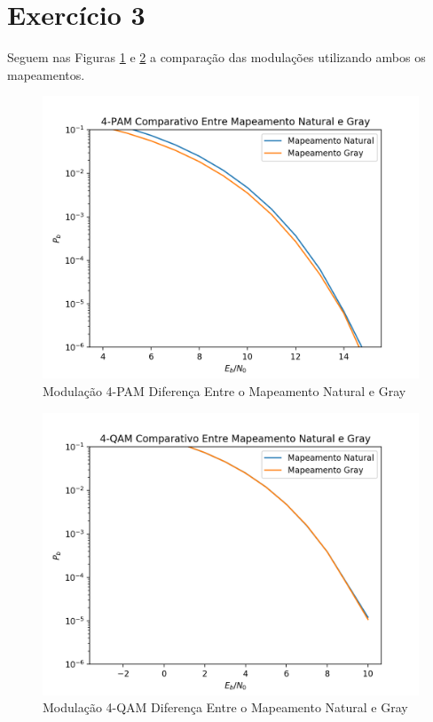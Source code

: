 \documentclass[10pt,two column,a4paper]{article}
\begin{document}
	\section{Exercício 3}
	
	Seguem nas Figuras \ref{kkkkk} e \ref{llllll} a comparação das modulações utilizando ambos os mapeamentos.
	\begin{figure}[h]
\centering
	\includegraphics[width=.8\linewidth]{../Exercicio3/PAM3}
	\caption{Modulação 4-PAM Diferença Entre o Mapeamento Natural e Gray}\label{kkkkk}
	\end{figure}
	\begin{figure}[h]
		\centering
		\includegraphics[width=.8\linewidth]{../Exercicio3/QAM3}
		\caption{Modulação 4-QAM Diferença Entre o Mapeamento Natural e Gray}\label{llllll}
	\end{figure}
%	
%	
%	
%	
\end{document}
